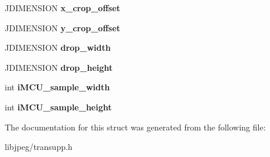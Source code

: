 \begin{DoxyCompactItemize}
\item 
\hypertarget{structjpeg__transform__info_ad96a77528f72b2251b94d04ae396b435}{J\-D\-I\-M\-E\-N\-S\-I\-O\-N {\bfseries x\-\_\-crop\-\_\-offset}}\label{structjpeg__transform__info_ad96a77528f72b2251b94d04ae396b435}

\item 
\hypertarget{structjpeg__transform__info_adeadce805b25751fd43263e2fcd2e166}{J\-D\-I\-M\-E\-N\-S\-I\-O\-N {\bfseries y\-\_\-crop\-\_\-offset}}\label{structjpeg__transform__info_adeadce805b25751fd43263e2fcd2e166}

\item 
\hypertarget{structjpeg__transform__info_a6c63db1d6f705cc9e4bccd2efee11bde}{J\-D\-I\-M\-E\-N\-S\-I\-O\-N {\bfseries drop\-\_\-width}}\label{structjpeg__transform__info_a6c63db1d6f705cc9e4bccd2efee11bde}

\item 
\hypertarget{structjpeg__transform__info_a4e51b93c0ac407e998e8d643465c48bb}{J\-D\-I\-M\-E\-N\-S\-I\-O\-N {\bfseries drop\-\_\-height}}\label{structjpeg__transform__info_a4e51b93c0ac407e998e8d643465c48bb}

\item 
\hypertarget{structjpeg__transform__info_a6c67f5ce5320a5d532acd6a6df14f1f4}{int {\bfseries i\-M\-C\-U\-\_\-sample\-\_\-width}}\label{structjpeg__transform__info_a6c67f5ce5320a5d532acd6a6df14f1f4}

\item 
\hypertarget{structjpeg__transform__info_a6b6606b8e8315e161fda4ddb29b2d410}{int {\bfseries i\-M\-C\-U\-\_\-sample\-\_\-height}}\label{structjpeg__transform__info_a6b6606b8e8315e161fda4ddb29b2d410}

\end{DoxyCompactItemize}


The documentation for this struct was generated from the following file\-:\begin{DoxyCompactItemize}
\item 
libjpeg/transupp.\-h\end{DoxyCompactItemize}
